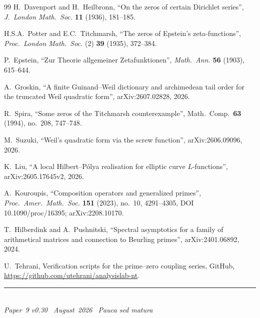 \documentclass[11pt]{article}
\begin{document}
\begin{thebibliography}{99}
H.~Davenport and H.~Heilbronn,
``On the zeros of certain Dirichlet series'',
\emph{J.\ London Math.\ Soc.} \textbf{11} (1936), 181--185.

H.S.A.~Potter and E.C.~Titchmarsh,
``The zeros of Epstein's zeta-functions'',
\emph{Proc.\ London Math.\ Soc.} (2) \textbf{39} (1935), 372--384.

P.~Epstein,
``Zur Theorie allgemeiner Zetafunktionen'',
\emph{Math.\ Ann.} \textbf{56} (1903), 615--644.

A.~Groskin,
``A finite Guinand--Weil dictionary and archimedean tail order for the
truncated Weil quadratic form'',
arXiv:2607.02828, 2026.

R.~Spira,
``Some zeros of the Titchmarsh counterexample'',
Math.\ Comp.\ \textbf{63} (1994), no.~208, 747--748.

M.~Suzuki,
``Weil's quadratic form via the screw function'',
arXiv:2606.09096, 2026.

K.~Liu,
``A local Hilbert--P\'olya realisation for elliptic curve
$L$-func\-tions'', arXiv:2605.\allowbreak17645v2, 2026.

A.~Kouroupis,
``Composition operators and generalized primes'',
\emph{Proc.\ Amer.\ Math.\ Soc.} \textbf{151} (2023), no.~10, 4291--4305,
DOI 10.1090/proc/16395; arXiv:2208.10170.

T.~Hilberdink and A.~Pushnitski,
``Spectral asymptotics for a family of arithmetical matrices and connection
to Beurling primes'',
arXiv:2401.06892, 2024.

U.~Tehrani,
Verification scripts for the prime--zero coupling series,
GitHub, \url{https://github.com/utehrani/analysislab-nt}.

\end{thebibliography}

\enlargethispage{3\baselineskip}
\vspace*{\fill}
\begin{minipage}{\linewidth}
\rule{\linewidth}{0.4pt}\smallskip\\
\small\emph{Paper~9 v0.30 \textperiodcentered\ August~2026
\textperiodcentered\ Pauca sed matura}
\end{minipage}
\end{document}
